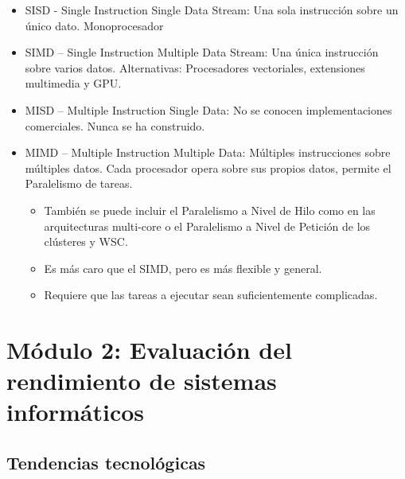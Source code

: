 \documentclass[12pt, twoside, openright]{report} %
\begin{document}
  \begin{itemize}
  
  \item
    SISD - Single Instruction Single Data Stream: Una sola instrucción
    sobre un único dato. Monoprocesador

      \item
    SIMD -- Single Instruction Multiple Data Stream: Una única
    instrucción sobre varios datos. Alternativas: Procesadores vectoriales, extensiones multimedia y
      GPU.

      \item
    MISD -- Multiple Instruction Single Data: No se conocen
    implementaciones comerciales. Nunca se ha construido.
  \item
    MIMD -- Multiple Instruction Multiple Data: Múltiples instrucciones
    sobre múltiples datos. Cada procesador opera sobre sus propios
    datos, permite el Paralelismo de tareas.

    \begin{itemize}
    
    \item
      También se puede incluir el Paralelismo a Nivel de Hilo como en
      las arquitecturas multi-core o el Paralelismo a Nivel de Petición
      de los clústeres y WSC.
    \item
      Es más caro que el SIMD, pero es más flexible y general.
    \item
      Requiere que las tareas a ejecutar sean suficientemente
      complicadas.
    \end{itemize}
  \end{itemize}

  \chapter{Módulo 2: Evaluación del rendimiento de sistemas informáticos}
  \section{Tendencias tecnológicas}
\end{document}
